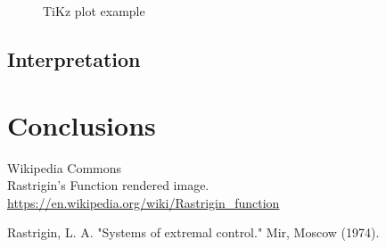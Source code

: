 \documentclass{article}
\begin{document}
\begin{figure}[!ht]%
  \centering %
\caption{TiKz plot example}
\end{figure}

\subsection{Interpretation}

\section{Conclusions}



\begin{thebibliography}{9}

  Wikipedia Commons \\ Rastrigin's Function rendered image.
  \url{https://en.wikipedia.org/wiki/Rastrigin_function}

  Rastrigin, L. A. "Systems of extremal control." Mir, Moscow (1974).
\end{thebibliography}  
\end{document}
